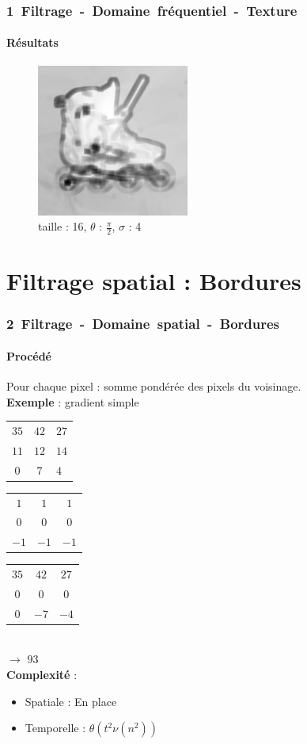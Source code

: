 \documentclass[french]{beamer}
\begin{document}
\begin{frame}
	\frametitle{\mbox{1 Filtrage - Domaine fréquentiel - Texture}}
	\framesubtitle{Résultats}
	\begin{figure}
		\centering
		\includegraphics[width=5cm]{images/roller_respn.jpg}
		\caption{taille : 16, $\theta$ : $\frac{\pi}{2}$, $\sigma$ : 4}
	\end{figure}
\end{frame}

\section{Filtrage spatial : Bordures}

\begin{frame}
	\frametitle{\mbox{2 Filtrage - Domaine spatial - Bordures}}
	\framesubtitle{Procédé}
	Pour chaque pixel : somme pondérée des pixels du voisinage.\\
	\textbf{Exemple} : gradient simple \\
	\medskip
	\begin{tabular}{|ccc|}
		\hline
		$35$ & $42$ & $27$ \\
		$11$ & $12$ & $14$ \\
		$0$ & $7$ & $4$ \\
		\hline
	\end{tabular}
	\begin{tabular}{|ccc|}
		\hline
		$1$ & $1$ & $1$ \\
		$0$ & $0$ & $0$ \\
		$-1$ & $-1$ & $-1$ \\
		\hline
	\end{tabular}
	\begin{tabular}{|ccc|}
		\hline
		$35$ & $42$ & $27$ \\
		$0$ & $0$ & $0$ \\
		$0$ & $-7$ & $-4$ \\
		\hline
	\end{tabular} \\
	\medskip
	$\longrightarrow$ 93 \\
	\bigskip
	\textbf{Complexité} :
	\begin{itemize}
		\item Spatiale : En place
		\item Temporelle : $\theta(t^2\nu(n^2))$
	\end{itemize}
\end{frame}
\end{document}
